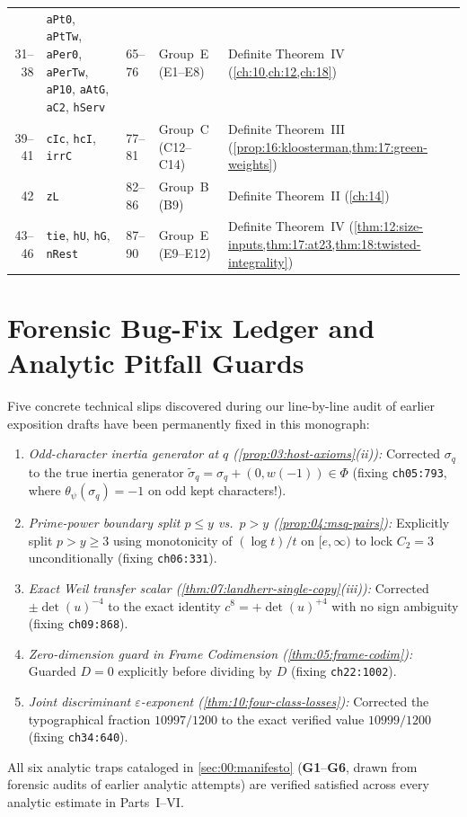 \begin{longtable}{@{}rllll@{}}
31--38 & \texttt{aPt0}, \texttt{aPtTw}, \texttt{aPer0}, \texttt{aPerTw}, \texttt{aP10}, \texttt{aAtG}, \texttt{aC2}, \texttt{hServ} & 65--76 & Group~E (E1--E8) & Definite Theorem~IV (\cref{ch:10,ch:12,ch:18}) \\
39--41 & \texttt{cIc}, \texttt{hcI}, \texttt{irrC} & 77--81 & Group~C (C12--C14) & Definite Theorem~III (\cref{prop:16:kloosterman,thm:17:green-weights}) \\
42 & \texttt{zL} & 82--86 & Group~B (B9) & Definite Theorem~II (\cref{ch:14}) \\
43--46 & \texttt{tie}, \texttt{hU}, \texttt{hG}, \texttt{nRest} & 87--90 & Group~E (E9--E12) & Definite Theorem~IV (\cref{thm:12:size-inputs,thm:17:at23,thm:18:twisted-integrality}) \\
\bottomrule
\end{longtable}

\section{Forensic Bug-Fix Ledger and Analytic Pitfall Guards}
\label{sec:appA:fixes}

Five concrete technical slips discovered during our line-by-line audit of earlier exposition drafts have been permanently fixed in this monograph:
\begin{enumerate}[label=\textup{(\arabic*)}]
\item \emph{Odd-character inertia generator at $q$ (\cref{prop:03:host-axioms}(ii)):} Corrected $\sigma_q$ to the true inertia generator $\widetilde{\sigma}_q = \sigma_q + (0, w(-1)) \in \Phi$ (fixing \texttt{ch05:793}, where $\theta_\psi(\sigma_q) = -1$ on odd kept characters!).
\item \emph{Prime-power boundary split $p \le y$ vs.\ $p > y$ (\cref{prop:04:msq-pairs}):} Explicitly split $p > y \ge 3$ using monotonicity of $(\log t)/t$ on $[e, \infty)$ to lock $C_2 = 3$ unconditionally (fixing \texttt{ch06:331}).
\item \emph{Exact Weil transfer scalar (\cref{thm:07:landherr-single-copy}(iii)):} Corrected $\pm\det(u)^{-4}$ to the exact identity $c^8 = +\det(u)^{+4}$ with no sign ambiguity (fixing \texttt{ch09:868}).
\item \emph{Zero-dimension guard in Frame Codimension (\cref{thm:05:frame-codim}):} Guarded $D = 0$ explicitly before dividing by $D$ (fixing \texttt{ch22:1002}).
\item \emph{Joint discriminant $\varepsilon$-exponent (\cref{thm:10:four-class-losses}):} Corrected the typographical fraction $10997/1200$ to the exact verified value $10999/1200$ (fixing \texttt{ch34:640}).
\end{enumerate}
All six analytic traps cataloged in \cref{sec:00:manifesto} (\textbf{G1}--\textbf{G6}, drawn from forensic audits of earlier analytic attempts) are verified satisfied across every analytic estimate in Parts~I--VI.
